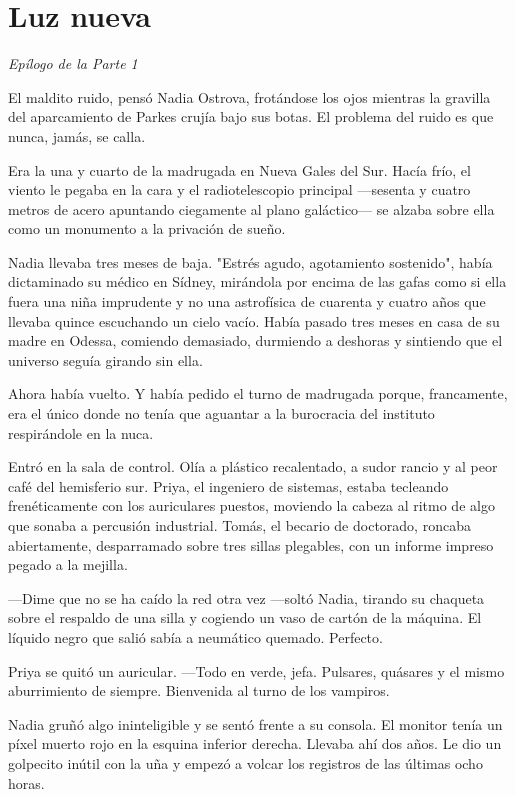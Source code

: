 \documentclass[11pt,a5paper,twoside]{book}
\begin{document}
\chapter{Luz nueva}

\textit{Epílogo de la Parte 1}

El maldito ruido, pensó Nadia Ostrova, frotándose los ojos mientras la gravilla del aparcamiento de Parkes crujía bajo sus botas. El problema del ruido es que nunca, jamás, se calla.

Era la una y cuarto de la madrugada en Nueva Gales del Sur. Hacía frío, el viento le pegaba en la cara y el radiotelescopio principal —sesenta y cuatro metros de acero apuntando ciegamente al plano galáctico— se alzaba sobre ella como un monumento a la privación de sueño.

Nadia llevaba tres meses de baja. "Estrés agudo, agotamiento sostenido", había dictaminado su médico en Sídney, mirándola por encima de las gafas como si ella fuera una niña imprudente y no una astrofísica de cuarenta y cuatro años que llevaba quince escuchando un cielo vacío. Había pasado tres meses en casa de su madre en Odessa, comiendo demasiado, durmiendo a deshoras y sintiendo que el universo seguía girando sin ella.

Ahora había vuelto. Y había pedido el turno de madrugada porque, francamente, era el único donde no tenía que aguantar a la burocracia del instituto respirándole en la nuca.

Entró en la sala de control. Olía a plástico recalentado, a sudor rancio y al peor café del hemisferio sur. Priya, el ingeniero de sistemas, estaba tecleando frenéticamente con los auriculares puestos, moviendo la cabeza al ritmo de algo que sonaba a percusión industrial. Tomás, el becario de doctorado, roncaba abiertamente, desparramado sobre tres sillas plegables, con un informe impreso pegado a la mejilla.

—Dime que no se ha caído la red otra vez —soltó Nadia, tirando su chaqueta sobre el respaldo de una silla y cogiendo un vaso de cartón de la máquina. El líquido negro que salió sabía a neumático quemado. Perfecto.

Priya se quitó un auricular.
—Todo en verde, jefa. Pulsares, quásares y el mismo aburrimiento de siempre. Bienvenida al turno de los vampiros.

Nadia gruñó algo ininteligible y se sentó frente a su consola. El monitor tenía un píxel muerto rojo en la esquina inferior derecha. Llevaba ahí dos años. Le dio un golpecito inútil con la uña y empezó a volcar los registros de las últimas ocho horas.
\end{document}
